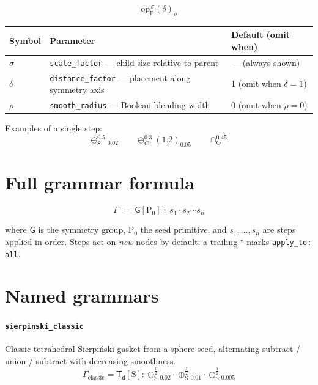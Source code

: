 \documentclass[11pt, a4paper]{article}
\newcommand{\G}[1]{\mathsf{#1}}          %
\newcommand{\prim}[1]{\mathrm{#1}}       %
\newcommand{\sub}{\ominus}               %
\newcommand{\add}{\oplus}                %
\newcommand{\intr}{\cap}                 %
\begin{document}
\[
  \boxed{\; \mathrm{op}_{\prim{P}}^{\,\sigma}(\delta)_{\rho} \;}
\]

\begin{center}
\begin{tabular}{lll}
\toprule
Symbol & Parameter & Default (omit when) \\
\midrule
$\sigma$ & \texttt{scale\_factor} — child size relative to parent & — (always shown) \\
$\delta$ & \texttt{distance\_factor} — placement along symmetry axis & 1 (omit when $\delta=1$) \\
$\rho$   & \texttt{smooth\_radius} — Boolean blending width & 0 (omit when $\rho=0$) \\
\bottomrule
\end{tabular}
\end{center}

\medskip
\noindent Examples of a single step:
\[
  \sub_{\prim{S}}^{0.5}{}_{\!0.02}
  \qquad
  \add_{\prim{C}}^{0.3}(1.2)_{\!0.05}
  \qquad
  \intr_{\prim{O}}^{0.45}
\]

\section*{Full grammar formula}

\[
  \boxed{\;
    \Gamma \;=\; \G{G}[\prim{P_0}] \;:\; s_1 \cdot s_2 \cdots s_n
  \;}
\]

where $\G{G}$ is the symmetry group, $\prim{P_0}$ the seed primitive, and
$s_1, \ldots, s_n$ are steps applied in order.
Steps act on \emph{new} nodes by default; a trailing ${}^{\!\star}$
marks \texttt{apply\_to: all}.

\section*{Named grammars}

\newcommand{\half}{\tfrac{1}{2}}

\paragraph{\texttt{sierpinski\_classic}}
Classic tetrahedral Sierpi\'nski gasket from a sphere seed,
alternating subtract / union / subtract with decreasing smoothness.
\[
  \Gamma_{\mathrm{classic}}
  = \G{T_d}[\prim{S}]
  : \sub_{\prim{S}}^{\half}{}_{\!0.02}
  \cdot \add_{\prim{S}}^{\half}{}_{\!0.01}
  \cdot \sub_{\prim{S}}^{\half}{}_{\!0.005}
\]
\end{document}
